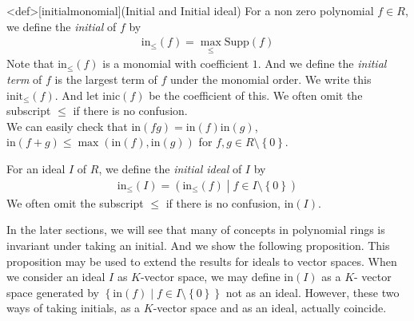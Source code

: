 \documentclass{article}
\renewcommand{\mid}{\middle|}
\begin{document}
\begin{statementsp}<def>[initialmonomial](Initial and Initial ideal)
    For a non zero polynomial $f \in R$, we define the \textit{initial} of $f$ by
    \begin{align}
        \mathrm{in}_{\leq}(f) = \max_{\leq} \mathrm{Supp}(f)
    \end{align}
    Note that $\mathrm{in}_{\leq}(f)$ is a monomial with coefficient $1$. And we define the \textit{initial term} of $f$ is the largest term of $f$ under the monomial order. We write this $\mathrm{init}_{\leq}(f)$. And let $\mathrm{inic}(f)$ be the coefficient of this. We often omit the subscript $\leq$ if there is no confusion.\\ 
    We can easily check that $\mathrm{in}(fg) = \mathrm{in}(f) \mathrm{in}(g)$, $\mathrm{in}(f+g) \leq \max(\mathrm{in}(f), \mathrm{in}(g))$ for $f,g \in R \setminus \left\{ 0 \right\}$.

    For an ideal $I$ of $R$, we define the \textit{initial ideal} of $I$ by
    \begin{align}
        \mathrm{in}_{\leq}(I) = \left( \mathrm{in}_{\leq}(f) \mid f \in I \setminus \left\{ 0 \right\} \right)
    \end{align}
    We often omit the subscript $\leq$ if there is no confusion, $\mathrm{in}(I)$.
\end{statementsp}

In the later sections, we will see that many of concepts in polynomial rings is invariant under taking an initial. And we show the following proposition. This proposition may be used to extend the results for ideals to vector spaces. When we consider an ideal $I$ as $K$-vector space, we may define $\mathrm{in}(I)$ as a $K$- vector space generated by $\left\{ \mathrm{in}(f) \mid f \in I \setminus \left\{ 0 \right\} \right\}$ not as an ideal. However, these two ways of taking initials, as a $K$-vector space and as an ideal, actually coincide.
\end{document}
